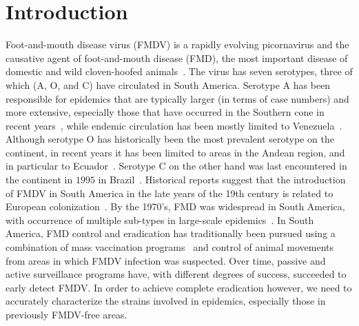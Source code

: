 \documentclass[10pt]{article}
\begin{document}
\section*{Introduction}

Foot-and-mouth disease virus (FMDV) is a rapidly evolving picornavirus and the causative agent of foot-and-mouth disease (FMD), the most important disease of domestic and wild cloven-hoofed animals~\cite{review}.
The virus has seven serotypes, three of which (A, O, and C) have circulated in South America.
Serotype A has been responsible for epidemics that are typically larger (in terms of case numbers) and more extensive, especially those that have occurred in the Southern cone in recent years~\cite{Perez2001, Malirat2012}, while endemic circulation has been mostly limited to Venezuela~\cite{Malirat2012}.
Although serotype O has historically been the most prevalent serotype on the continent, in recent years it has been limited to areas in the Andean region, and in particular to Ecuador~\cite{andean}.
Serotype C on the other hand was last encountered in the continent in $1995$ in Brazil~\cite{review_eradication}.
Historical reports suggest that the introduction of FMDV in South America in the late years of the 19th century is related to European colonization~\cite{Naranjo2013, tully}. 
By the 1970's, FMD was widespread in South America, with occurrence of multiple sub-types in large-scale epidemics~\cite{Saraiva2003}.
In South America, FMD control and eradication has traditionally been pursued using a combination of mass vaccination programs~\cite{vaccinationSA} and control of animal movements from areas in which FMDV infection was suspected.
Over time, passive and active surveillance programs have, with different degrees of success, succeeded to early detect FMDV.
In order to achieve complete eradication however, we need to accurately characterize the strains involved in epidemics, especially those in previously FMDV-free areas.
\end{document}
